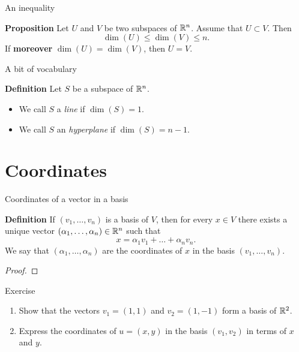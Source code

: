\documentclass{beamer}
\begin{document}
\begin{frame}[t]{An inequality}
	\begin{block}{\bf Proposition}
		Let	$U$ and $V$ be two subspaces of $\mathbb{R}^n$. Assume that $U \subset V$. Then
		$$
		\dim(U) \leq \dim(V) \leq n.
		$$
		If \textbf{moreover} $\dim(U) = \dim(V)$, then $U = V$.
	\end{block}
\end{frame}

\begin{frame}[t]{A bit of vocabulary}
	\begin{block}{\bf Definition}
		Let $S$ be a subspace of $\mathbb{R}^n$.
		\begin{itemize}
			\item We call $S$ a \emph{line} if $\dim(S) = 1$.
			\item We call $S$ an \emph{hyperplane} if $\dim(S) = n-1$.
		\end{itemize}
	\end{block}
\end{frame}

\section{Coordinates}
\begin{frame}[t]{Coordinates of a vector in a basis}
	\vspace{-0.4cm}
	\begin{block}{\bf Definition}
		If $(v_1, \dots, v_n)$ is a basis of $V$, then for every $x \in V$ there exists a unique vector $(\alpha_1, \dots, \alpha_n) \in \mathbb{R}^n$ such that
		$$
		x = \alpha_1 v_1 + \dots + \alpha_n v_n.
		$$
		We say that $(\alpha_1, \dots, \alpha_n)$ are the coordinates of $x$ in the basis $(v_1, \dots, v_n)$.
	\end{block}
	\begin{proof}
		\vspace{2.5cm}
		\vfill
	\end{proof}
\end{frame}

\begin{frame}[t]{Exercise}
	\vspace{-0.8cm}
	\begin{exampleblock}{}
		\begin{enumerate}
			\item Show that the vectors $v_1 = (1,1)$ and $v_2=(1,-1)$ form a basis of $\mathbb{R}^2$.
			\item Express the coordinates of $u=(x,y)$ in the basis $(v_1,v_2)$ in terms of $x$ and $y$.
		\end{enumerate}
	\end{exampleblock}
	\pause
\end{frame}
\end{document}

